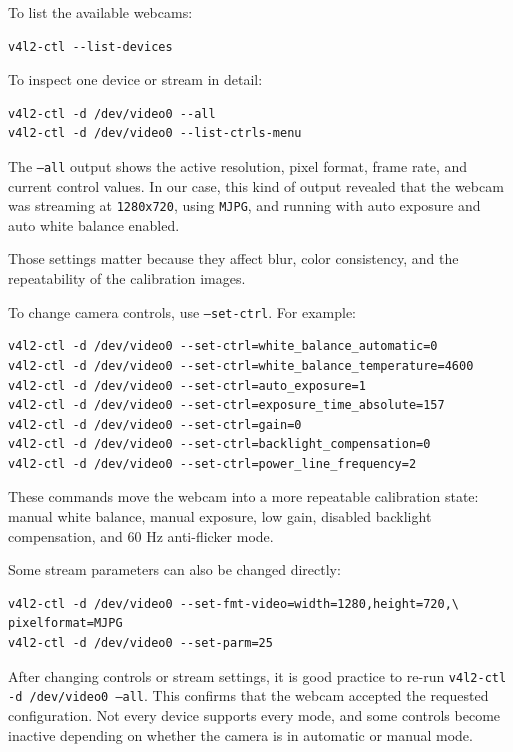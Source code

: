 \documentclass[11pt]{article}
\begin{document}
To list the available webcams:

\begin{verbatim}
v4l2-ctl --list-devices
\end{verbatim}

To inspect one device or stream in detail:

\begin{verbatim}
v4l2-ctl -d /dev/video0 --all
v4l2-ctl -d /dev/video0 --list-ctrls-menu
\end{verbatim}

The \texttt{--all} output shows the active resolution, pixel format, frame
rate, and current control values. In our case, this kind of output revealed
that the webcam was streaming at \texttt{1280x720}, using \texttt{MJPG}, and
running with auto exposure and auto white balance enabled.

Those settings matter because they affect blur, color consistency, and the
repeatability of the calibration images.

To change camera controls, use \texttt{--set-ctrl}. For example:

\begin{verbatim}
v4l2-ctl -d /dev/video0 --set-ctrl=white_balance_automatic=0
v4l2-ctl -d /dev/video0 --set-ctrl=white_balance_temperature=4600
v4l2-ctl -d /dev/video0 --set-ctrl=auto_exposure=1
v4l2-ctl -d /dev/video0 --set-ctrl=exposure_time_absolute=157
v4l2-ctl -d /dev/video0 --set-ctrl=gain=0
v4l2-ctl -d /dev/video0 --set-ctrl=backlight_compensation=0
v4l2-ctl -d /dev/video0 --set-ctrl=power_line_frequency=2
\end{verbatim}

These commands move the webcam into a more repeatable calibration state:
manual white balance, manual exposure, low gain, disabled backlight
compensation, and 60 Hz anti-flicker mode.

Some stream parameters can also be changed directly:

\begin{verbatim}
v4l2-ctl -d /dev/video0 --set-fmt-video=width=1280,height=720,\
pixelformat=MJPG
v4l2-ctl -d /dev/video0 --set-parm=25
\end{verbatim}

After changing controls or stream settings, it is good practice to re-run
\texttt{v4l2-ctl -d /dev/video0 --all}. This confirms that the webcam
accepted the requested configuration. Not every device supports every mode,
and some controls become inactive depending on whether the camera is in
automatic or manual mode.
\end{document}
